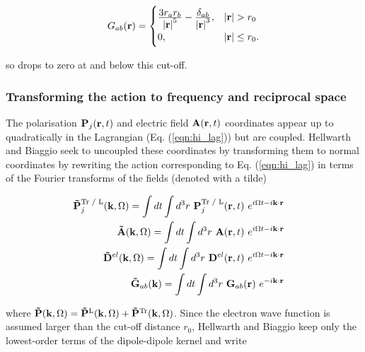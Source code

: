 \begin{equation}
    G_{ab}(\vb{r}) = 
    \begin{cases}
        \frac{\displaystyle 3r_a r_b}{\displaystyle \abs{\vb{r}}^5} - \frac{\displaystyle \delta_{ab}}{\displaystyle \abs{\vb{r}}^3}, & \abs{\vb{r}} > r_0 \\
        0, & \abs{\vb{r}} \leq r_0.
    \end{cases}
\end{equation}

so drops to zero at and below this cut-off.

\subsubsection{Transforming the action to frequency and reciprocal space}

The polarisation $\vb{P}_j(\vb{r}, t)$ and electric field $\vb{A}(\vb{r}, t)$ coordinates appear up to quadratically in the Lagrangian (Eq. (\ref{eqn:hi_lag})) but are coupled. Hellwarth and Biaggio seek to uncoupled these coordinates by transforming them to normal coordinates by rewriting the action corresponding to Eq. (\ref{eqn:hi_lag}) in terms of the Fourier transforms of the fields (denoted with a tilde)

\begin{align}
    \begin{split}
        \vb{\Tilde{P}}^{\text{Tr / L}}_j(\vb{k}, \Omega) &= \int dt \int d^3r\ \vb{P}_j^{\text{Tr / L}}(\vb{r}, t)\ e^{i\Omega t - i \vb{k} \cdot \vb{r}}
    \end{split}\\
    \begin{split}
        \vb{\Tilde{A}}(\vb{k}, \Omega) &= \int dt \int d^3r\ \vb{A}(\vb{r}, t)\ e^{i\Omega t - i \vb{k} \cdot \vb{r}}
    \end{split}\\
    \begin{split}\label{eqn:D_transform}
        \vb{\Tilde{D}}^{el}(\vb{k}, \Omega) &= \int dt \int d^3r\ \vb{D}^{el}(\vb{r}, t)\ e^{i\Omega t - i \vb{k} \cdot \vb{r}}
    \end{split}\\
    \begin{split}
        \vb{\Tilde{G}}_{ab}(\vb{k}) &= \int dt \int d^3r\ \vb{G}_{ab}(\vb{r})\ e^{- i \vb{k} \cdot \vb{r}}
    \end{split}
\end{align}

where $\vb{\Tilde{P}}(\vb{k}, \Omega) = \vb{\Tilde{P}}^{\text{L}}(\vb{k}, \Omega) + \vb{\Tilde{P}}^{\text{Tr}}(\vb{k}, \Omega)$. Since the electron wave function is assumed larger than the cut-off distance $r_0$, Hellwarth and Biaggio keep only the lowest-order terms of the dipole-dipole kernel and write


